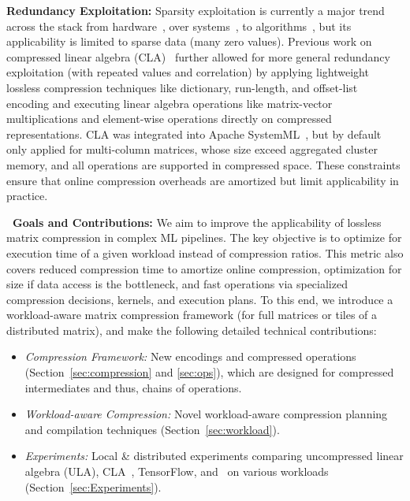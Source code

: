 \textbf{Redundancy Exploitation:} Sparsity exploitation is currently a major trend across the stack from hardware~\cite{A100, Olukotun21}, over systems~\cite{BoehmRHSEP18, LuoJYJ21,Sommer0ERH19}, to algorithms~\cite{tfmopt1, FrankleD0C21, abs-2107-05768}, but its applicability is limited to sparse data (many zero values). Previous work on compressed linear algebra (CLA)~\cite{ElgoharyBHRR16, ElgoharyBHRR18} further allowed for more general redundancy exploitation (with repeated values and correlation) by applying lightweight lossless compression techniques like dictionary, run-length, and offset-list encoding and executing linear algebra operations like matrix-vector multiplications and element-wise operations directly on compressed representations. CLA was integrated into Apache SystemML~\cite{BoehmDEEMPRRSST16}, but by default only applied for multi-column matrices, whose size exceed aggregated cluster memory, and all operations are supported in compressed space. These constraints ensure that online compression overheads are amortized but limit applicability in practice.

\textbf{\name~Goals and Contributions:} We aim to improve the applicability of lossless matrix compression in complex ML pipelines. The key objective is to optimize for execution time of a given workload instead of compression ratios. This metric also covers reduced compression time to amortize online compression, optimization for size if data access is the bottleneck, and fast operations via specialized compression decisions, kernels, and execution plans. To this end, we introduce a workload-aware matrix compression framework (for full matrices or tiles of a distributed matrix), and make the following detailed technical contributions:
\begin{itemize}
 \item \emph{Compression Framework:} New encodings and compressed operations (Section~\ref{sec:compression} and \ref{sec:ops}), which are designed for compressed intermediates and thus, chains of operations.
 \item \emph{Workload-aware Compression:} Novel workload-aware compression planning and compilation techniques (Section~\ref{sec:workload}).
 \item \emph{Experiments:} Local \& distributed experiments comparing uncompressed linear algebra (ULA), CLA~\cite{ElgoharyBHRR16, ElgoharyBHRR18}, TensorFlow, and \name\ on various workloads (Section~\ref{sec:Experiments}).
\end{itemize}
